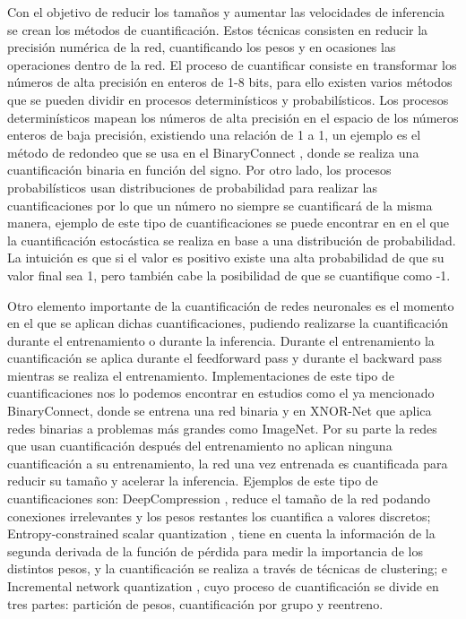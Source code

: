 Con el objetivo de reducir los tamaños y aumentar las velocidades de inferencia se crean los métodos de cuantificación. Estos técnicas consisten en reducir la precisión numérica de la red, cuantificando los pesos y en ocasiones las operaciones dentro de la red. El proceso de cuantificar consiste en transformar los números de alta precisión en enteros de 1-8 bits, para ello existen varios métodos que se pueden dividir en procesos determinísticos y probabilísticos. Los procesos determinísticos mapean los números de alta precisión en el espacio de los números enteros de baja precisión, existiendo una relación de 1 a 1, un ejemplo es el método de redondeo que se usa en el BinaryConnect \cite{10.5555/2969442.2969588}, donde se realiza una cuantificación binaria en función del signo. Por otro lado, los procesos probabilísticos usan distribuciones de probabilidad para realizar las cuantificaciones por lo que un número no siempre se cuantificará de la misma manera, ejemplo de este tipo de cuantificaciones se puede encontrar en \cite{10.5555/2969442.2969588} en el que la cuantificación estocástica se realiza en base a una distribución de probabilidad. La intuición es que si el valor es positivo existe una alta probabilidad de que su valor final sea 1, pero también cabe la posibilidad de que se cuantifique como -1. 

Otro elemento importante de la cuantificación de redes neuronales es el momento en el que se aplican dichas cuantificaciones, pudiendo realizarse la cuantificación durante el entrenamiento o durante la inferencia. Durante el entrenamiento la cuantificación se aplica durante el feedforward pass y durante el backward pass mientras se realiza el entrenamiento. Implementaciones de este tipo de cuantificaciones nos lo podemos encontrar en estudios como el ya mencionado BinaryConnect, donde se entrena una red binaria y en XNOR-Net \cite{Rastegari2016XNORNetIC} que aplica redes binarias a problemas más grandes como ImageNet. Por su parte la redes que usan cuantificación después del entrenamiento no aplican ninguna cuantificación a su entrenamiento, la red una vez entrenada es cuantificada para reducir su tamaño y acelerar la inferencia. Ejemplos de este tipo de cuantificaciones son: DeepCompression \cite{DBLP:journals/corr/HanMD15}, reduce el tamaño de la red podando conexiones irrelevantes y los pesos restantes los cuantifica a valores discretos; Entropy-constrained scalar quantization \cite{DBLP:conf/iclr/ChoiEL17}, tiene en cuenta la información de la segunda derivada de la función de pérdida para medir la importancia de los distintos pesos, y la cuantificación se realiza a través de técnicas de clustering; e Incremental network quantization \cite{DBLP:journals/corr/ZhouYGXC17}, cuyo proceso de cuantificación se divide en tres partes: partición de pesos, cuantificación por grupo y reentreno. \cite{https://doi.org/10.48550/arxiv.1808.04752}

